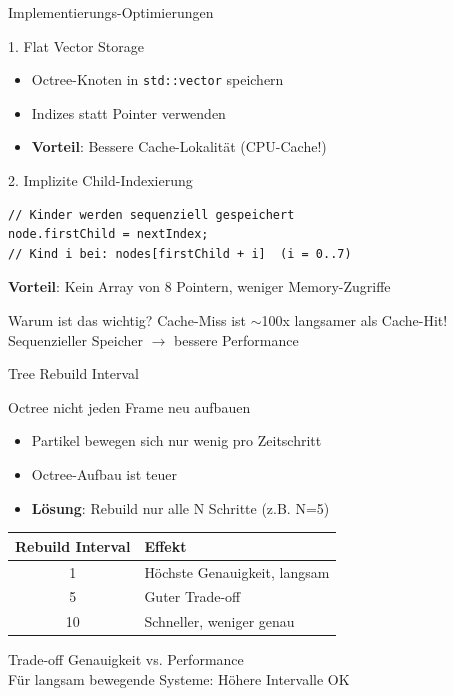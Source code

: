 \documentclass[xcolor=dvipsnames]{beamer}
\begin{document}
\begin{frame}[fragile]{Implementierungs-Optimierungen}
\begin{block}{1. Flat Vector Storage}
\begin{itemize}
    \item Octree-Knoten in \texttt{std::vector} speichern
    \item Indizes statt Pointer verwenden
    \item \textbf{Vorteil}: Bessere Cache-Lokalität (CPU-Cache!)
\end{itemize}
\end{block}

\begin{block}{2. Implizite Child-Indexierung}
\begin{lstlisting}
// Kinder werden sequenziell gespeichert
node.firstChild = nextIndex;
// Kind i bei: nodes[firstChild + i]  (i = 0..7)
\end{lstlisting}
\textbf{Vorteil}: Kein Array von 8 Pointern, weniger Memory-Zugriffe
\end{block}

\begin{alertblock}{Warum ist das wichtig?}
Cache-Miss ist $\sim$100x langsamer als Cache-Hit! \\
Sequenzieller Speicher $\rightarrow$ bessere Performance
\end{alertblock}
\end{frame}

\begin{frame}{Tree Rebuild Interval}
\begin{block}{Octree nicht jeden Frame neu aufbauen}
\begin{itemize}
    \item Partikel bewegen sich nur wenig pro Zeitschritt
    \item Octree-Aufbau ist teuer
    \item \textbf{Lösung}: Rebuild nur alle N Schritte (z.B. N=5)
\end{itemize}
\end{block}

\begin{table}
\centering
\begin{tabular}{c|l}
\textbf{Rebuild Interval} & \textbf{Effekt} \\ \hline
1 & Höchste Genauigkeit, langsam \\
5 & Guter Trade-off \\
10 & Schneller, weniger genau
\end{tabular}
\end{table}

\begin{exampleblock}{Trade-off}
Genauigkeit vs. Performance \\
Für langsam bewegende Systeme: Höhere Intervalle OK
\end{exampleblock}
\end{frame}
\end{document}
